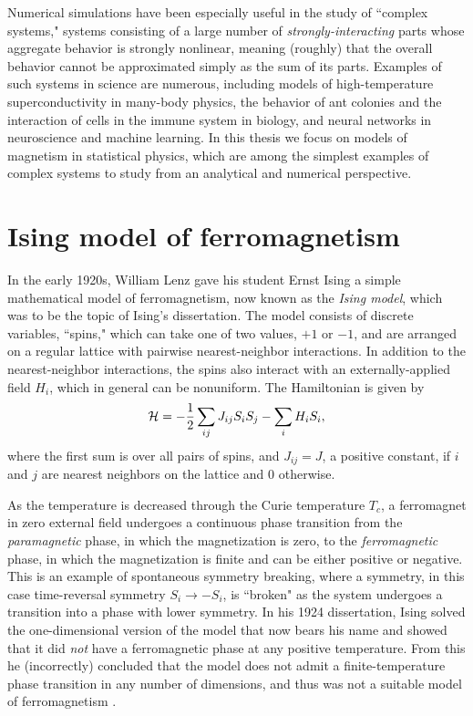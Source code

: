 Numerical simulations have been especially useful in the study of ``complex
systems," systems consisting of a large number of \emph{strongly-interacting}
parts whose aggregate behavior is strongly nonlinear, meaning (roughly) that
the overall behavior cannot be approximated simply as the sum of its parts.
Examples of such systems in science are numerous, including models of
high-temperature superconductivity in many-body physics, the behavior of ant
colonies and the interaction of cells in the immune system in biology, and
neural networks in neuroscience and machine learning. In this thesis we focus
on models of magnetism in statistical physics, which are among the simplest
examples of complex systems to study from an analytical and numerical
perspective.


\section{Ising model of ferromagnetism}
\label{sec:intro-ising}

In the early 1920s, William Lenz gave his student Ernst Ising a simple
mathematical model of ferromagnetism, now known as the \emph{Ising model},
which was to be the topic of Ising's dissertation. The model consists of
discrete variables, ``spins," which can take one of two values, $+1$ or $-1$,
and are arranged on a regular lattice with pairwise nearest-neighbor
interactions. In addition to the nearest-neighbor interactions, the spins also
interact with an externally-applied field $H_i$, which in general can be
nonuniform. The Hamiltonian is given by
\begin{equation}
  \mathcal{H} = -\frac{1}{2} \sum_{ij} J_{ij} S_i S_j - \sum_i H_i S_i,
  \label{eq:ising-ham}
\end{equation}
where the first sum is over all pairs of spins, and $J_{ij}=J$, a positive
constant, if $i$ and $j$ are nearest neighbors on the lattice and 0 otherwise.

As the temperature is decreased through the Curie temperature $T_c$, a
ferromagnet in zero external field undergoes a continuous phase transition from
the \emph{paramagnetic} phase, in which the magnetization is zero, to the
\emph{ferromagnetic} phase, in which the magnetization is finite and can be
either positive or negative. This is an example of spontaneous symmetry
breaking, where a symmetry, in this case time-reversal symmetry $S_i \to -S_i$,
is ``broken" as the system undergoes a transition into a phase with lower
symmetry. In his 1924 dissertation, Ising solved the one-dimensional version
of the model that now bears his name and showed that it did \emph{not} have a
ferromagnetic phase at any positive temperature. From this he (incorrectly)
concluded that the model does not admit a finite-temperature phase transition
in any number of dimensions, and thus was not a suitable model of
ferromagnetism \autocite{ising1925beitrag}.

